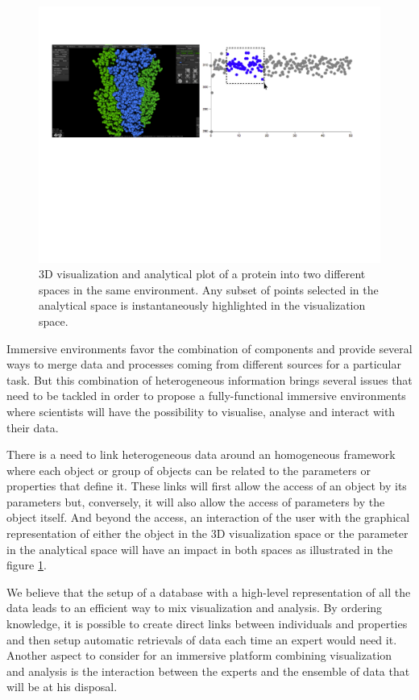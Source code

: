 \documentclass{vgtc}                          %
\begin{document}
\begin{figure}[htb]
  \centering
  \includegraphics[width=\linewidth]{figures/interactive_selection.pdf}
  \caption{3D visualization and analytical plot of a protein into two different spaces in the same environment. Any subset of points selected in the analytical space is instantaneously highlighted in the visualization space.}
  \label{interactive_selection}
\end{figure}

Immersive environments favor the combination of components and provide several ways to merge 
data and processes coming from different sources for a particular task. But this combination of heterogeneous information brings several issues that need to be tackled in order to propose a fully-functional immersive environments where scientists will have the possibility to visualise, analyse and interact with their data.

There is a need to link heterogeneous data around an homogeneous framework where each object or group of objects can be related to the parameters or properties that define it. These links will first allow the access of an object by its parameters but, conversely, it will also allow the access of parameters by the object itself. And beyond the access, an interaction of the user with the graphical representation of either the object in the 3D visualization space or the parameter in the analytical space will have an impact in both spaces as illustrated in the figure \ref{interactive_selection}.

We believe that the setup of a database with a high-level representation of all the data leads to an efficient way to mix visualization and analysis. By ordering knowledge, it is possible to create direct links between individuals and properties and then setup automatic retrievals of data each time an expert would need it.
Another aspect to consider for an immersive platform combining visualization and analysis is the interaction between the experts and the ensemble of data that will be at his disposal.
\end{document}
